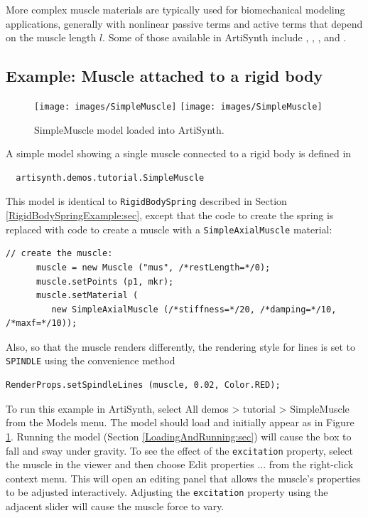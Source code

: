 More complex muscle materials are typically used for biomechanical
modeling applications, generally with nonlinear passive terms and
active terms that depend on the muscle length $l$.  Some of those
available in ArtiSynth include
,
,
, and
.


\subsection{Example: Muscle attached to a rigid body}
\label{SimpleMuscleExample:sec}

\begin{figure}[ht]
\begin{center}
\iflatexml
 \texttt{[image: images/SimpleMuscle]}
\else
 \texttt{[image: images/SimpleMuscle]}
\fi
\end{center}
\caption{SimpleMuscle model loaded into ArtiSynth.}
\label{SimpleMuscle:fig}
\end{figure}

A simple model showing a single muscle connected to a rigid
body is defined in
%
\begin{verbatim}
  artisynth.demos.tutorial.SimpleMuscle
\end{verbatim}
%

This model is identical to {\tt RigidBodySpring} described in Section
\ref{RigidBodySpringExample:sec}, except that the code to create
the spring is replaced with code to create a muscle
with a {\tt SimpleAxialMuscle} material:
%
\begin{lstlisting}[]
      // create the muscle:      
      muscle = new Muscle ("mus", /*restLength=*/0);
      muscle.setPoints (p1, mkr);
      muscle.setMaterial (
         new SimpleAxialMuscle (/*stiffness=*/20, /*damping=*/10, /*maxf=*/10));
\end{lstlisting}
%
Also, so that the muscle renders differently, the rendering style
for lines is set to {\tt SPINDLE} using the convenience method
%
\begin{lstlisting}[]
      RenderProps.setSpindleLines (muscle, 0.02, Color.RED);
\end{lstlisting}
%

To run this example in ArtiSynth, select {\sf All demos > tutorial >
SimpleMuscle} from the {\sf Models} menu. The model should load and
initially appear as in Figure \ref{SimpleMuscle:fig}.  Running the
model (Section \ref{LoadingAndRunning:sec}) will cause the box to fall
and sway under gravity. To see the effect of the {\tt excitation}
property, select the muscle in the viewer and then choose {\sf Edit
properties ...} from the right-click context menu.  This will open an
editing panel that allows the muscle's properties to be adjusted
interactively. Adjusting the {\tt excitation} property using the
adjacent slider will cause the muscle force to vary.

